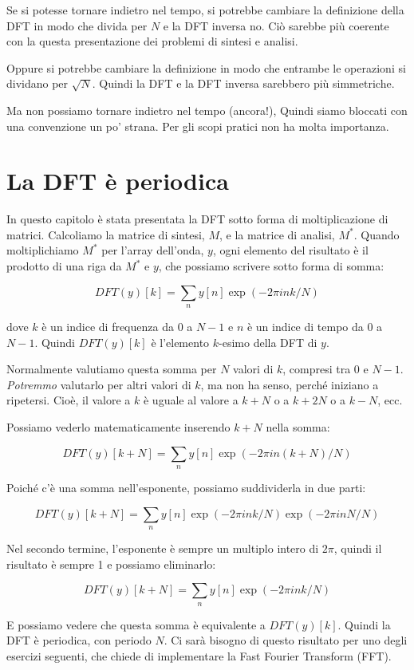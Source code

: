 \documentclass[12pt,a4paper]{book}
\begin{document}
Se si potesse tornare indietro nel tempo, si potrebbe cambiare la definizione della DFT in modo che divida per $N$ e la DFT inversa no. Ciò sarebbe più coerente con la questa presentazione dei problemi di sintesi e analisi.

Oppure si potrebbe cambiare la definizione in modo che entrambe le operazioni si dividano per $\sqrt{N}$. Quindi la DFT e la DFT inversa sarebbero più simmetriche.

Ma non possiamo tornare indietro nel tempo (ancora!), Quindi siamo bloccati con una convenzione un po' strana. Per gli scopi pratici non ha molta importanza.

\section{La DFT è periodica} 

In questo capitolo è stata presentata la DFT sotto forma di moltiplicazione di matrici. Calcoliamo la matrice di sintesi, $M$, e la matrice di analisi, $M^*$. Quando moltiplichiamo $M^{*}$ per l'array dell'onda, $y$, ogni elemento del risultato è il prodotto di una riga da $M^*$ e $y$, che possiamo scrivere sotto forma di somma:

%
\[ DFT(y)[k] = \sum_n y[n] \exp(-2 \pi i n k / N) \] 

%
dove $k$ è un indice di frequenza da $0$ a $N-1$ e $n$ è un indice di tempo da $0$ a $N-1$. Quindi $DFT(y)[k]$ è l'elemento $k$-esimo della DFT di $y$.

Normalmente valutiamo questa somma per $N$ valori di $k$, compresi tra 0 e $N-1$. {\em Potremmo} valutarlo per altri valori di $k$, ma non ha senso, perché iniziano a ripetersi. Cioè, il valore a $k$ è uguale al valore a $k+N$ o a $k+2N$ o a $k-N$, ecc.

Possiamo vederlo matematicamente inserendo $k+N$ nella somma:

%
\[ DFT(y)[k+N] = \sum_n y[n] \exp(-2 \pi i n (k+N) / N) \] 

%
Poiché c'è una somma nell'esponente, possiamo suddividerla in due parti:

%
\[ DFT(y)[k+N] = \sum_n y[n] \exp(-2 \pi i n k / N) \exp(-2 \pi i n N / N) \] 

%
Nel secondo termine, l'esponente è sempre un multiplo intero di $2 \pi$, quindi il risultato è sempre 1 e possiamo eliminarlo:

%
\[ DFT(y)[k+N] = \sum_n y[n] \exp(-2 \pi i n k / N) \] 

%
E possiamo vedere che questa somma è equivalente a $ DFT(y)[k]$. Quindi la DFT è periodica, con periodo $N$. Ci sarà bisogno di questo risultato per uno degli esercizi seguenti, che chiede di implementare la Fast Fourier Transform (FFT).
\end{document}
